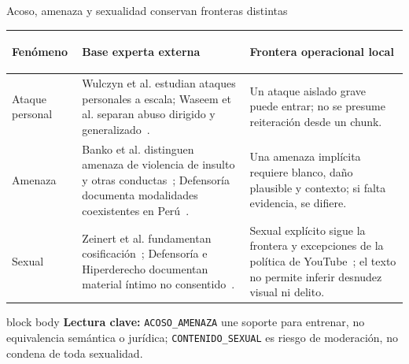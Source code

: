 \documentclass[aspectratio=169,10pt]{beamer}
\newcommand{\takeaway}[1]{%
  \begin{beamercolorbox}[wd=\textwidth,sep=1.5mm,rounded=true]{block body}%
    \color{Navy}\small\textbf{Lectura clave:} #1
  \end{beamercolorbox}%
}
\begin{document}
\begin{frame}{Acoso, amenaza y sexualidad conservan fronteras distintas}
  \scriptsize
  \renewcommand{\arraystretch}{1.18}
  \begin{tabularx}{\textwidth}{>{\bfseries\raggedright\arraybackslash}p{32mm}X>{\raggedright\arraybackslash}p{50mm}}
    \toprule
    Fenómeno & Base experta externa & Frontera operacional local \\
    \midrule
    Ataque personal & Wulczyn et al. estudian ataques personales a escala; Waseem et al. separan abuso dirigido y generalizado~\cite{wulczyn2017exmachina,waseem2017abuse}. & Un ataque aislado grave puede entrar; no se presume reiteración desde un chunk. \\
    Amenaza & Banko et al. distinguen amenaza de violencia de insulto y otras conductas~\cite{banko2020taxonomy}; Defensoría documenta modalidades coexistentes en Perú~\cite{defensoria2021violenciaenlinea}. & Una amenaza implícita requiere blanco, daño plausible y contexto; si falta evidencia, se difiere. \\
    Sexual & Zeinert et al. fundamentan cosificación~\cite{zeinert2021misogyny}; Defensoría e Hiperderecho documentan material íntimo no consentido~\cite{defensoria2021violenciaenlinea,albornoz2018conocer}. & Sexual explícito sigue la frontera y excepciones de la política de YouTube~\cite{youtube2026sexualpolicy}; el texto no permite inferir desnudez visual ni delito. \\
    \bottomrule
  \end{tabularx}
  \vspace{3mm}
  \takeaway{\texttt{ACOSO\_AMENAZA} une soporte para entrenar, no equivalencia semántica o jurídica; \texttt{CONTENIDO\_SEXUAL} es riesgo de moderación, no condena de toda sexualidad.}
\end{frame}
\end{document}
